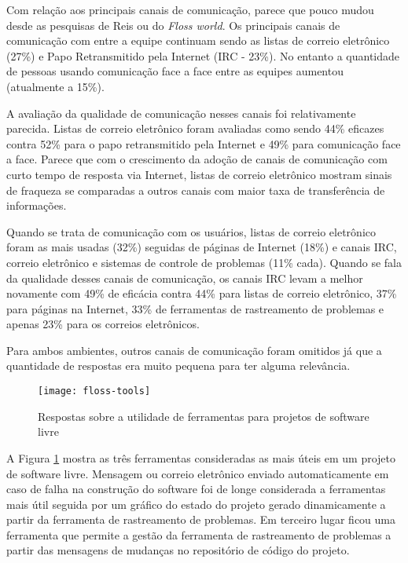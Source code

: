 Com relação aos principais canais de comunicação, parece que pouco
mudou desde as pesquisas de Reis ou do \textit{Floss world}. Os
principais canais de comunicação com entre a equipe continuam sendo as
listas de correio eletrônico (27\%) e Papo Retransmitido pela Internet
(IRC - 23\%). No entanto a quantidade de pessoas usando comunicação
face a face entre as equipes aumentou (atualmente a 15\%).

A avaliação da qualidade de comunicação nesses canais foi
relativamente parecida. Listas de correio eletrônico foram avaliadas
como sendo 44\% eficazes contra 52\% para o papo retransmitido pela
Internet e 49\% para comunicação face a face. Parece que com o
crescimento da adoção de canais de comunicação com curto tempo de
resposta via Internet, listas de correio eletrônico mostram sinais de
fraqueza se comparadas a outros canais com maior taxa de transferência
de informações.

Quando se trata de comunicação com os usuários, listas de correio
eletrônico foram as mais usadas (32\%) seguidas de páginas de Internet
(18\%) e canais IRC, correio eletrônico e sistemas de controle de
problemas (11\% cada). Quando se fala da qualidade desses canais de
comunicação, os canais IRC levam a melhor novamente com 49\% de
eficácia contra 44\% para listas de correio eletrônico, 37\% para
páginas na Internet, 33\% de ferramentas de rastreamento de problemas
e apenas 23\% para os correios eletrônicos.

Para ambos ambientes, outros canais de comunicação foram omitidos já
que a quantidade de respostas era muito pequena para ter alguma
relevância.

\begin{figure}
  \centering
  \texttt{[image: floss-tools]}
  \caption{Respostas sobre a utilidade de ferramentas para projetos de
    software livre}
  \label{fig:floss-tools}
\end{figure}

A Figura \ref{fig:floss-tools} mostra as três ferramentas consideradas
as mais úteis em um projeto de software livre. Mensagem ou correio
eletrônico enviado automaticamente em caso de falha na construção do
software foi de longe considerada a ferramentas mais útil seguida por
um gráfico do estado do projeto gerado dinamicamente a partir da
ferramenta de rastreamento de problemas. Em terceiro lugar ficou uma
ferramenta que permite a gestão da ferramenta de rastreamento de
problemas a partir das mensagens de mudanças no repositório de código
do projeto.

